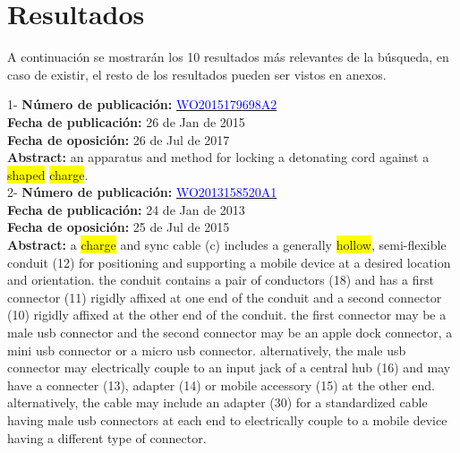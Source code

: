 \chapter{Resultados}
 A continuación se mostrarán los 10 resultados más 
    relevantes de la búsqueda, en caso de existir, el resto de los resultados pueden ser vistos en anexos.
 
 \vspace{1cm}1- \textbf{Número de publicación:} \href{https://worldwide.espacenet.com/publicationDetails/biblio?DB=EPODOC&II=0&ND=3&adjacent=true&locale=en_EP&FT=D&date=20160331&CC=WO&NR=2015179698A2&KC=A2#}{\textcolor{blue}{WO2015179698A2}}\\ 
\textbf{Fecha de publicación:} 26 de Jan de 2015\\ 
\textbf{Fecha de oposición:} 26 de Jul de 2017\\ 
\textbf{Abstract:} an apparatus and method for locking a detonating cord against a \colorbox{yellow}{shaped} \colorbox{yellow}{\colorbox{yellow}{charge}}.\\ 
 

 \vspace{1cm}2- \textbf{Número de publicación:} \href{https://worldwide.espacenet.com/publicationDetails/biblio?DB=EPODOC&II=0&ND=3&adjacent=true&locale=en_EP&FT=D&date=20160331&CC=WO&NR=2013158520A1&KC=A1#}{\textcolor{blue}{WO2013158520A1}}\\ 
\textbf{Fecha de publicación:} 24 de Jan de 2013\\ 
\textbf{Fecha de oposición:} 25 de Jul de 2015\\ 
\textbf{Abstract:} a \colorbox{yellow}{\colorbox{yellow}{charge}} and sync cable (c) includes a generally \colorbox{yellow}{\colorbox{yellow}{hollow}}, semi-flexible conduit (12) for positioning and supporting a mobile device at a desired location and orientation. the conduit contains a pair of conductors (18) and has a first connector (11) rigidly affixed at one end of the conduit and a second connector (10) rigidly affixed at the other end of the conduit. the first connector may be a male usb connector and the second connector may be an apple  dock connector, a mini usb connector or a micro usb connector. alternatively, the male usb connector may electrically couple to an input jack of a central hub (16) and may have a connecter (13), adapter (14) or mobile accessory (15) at the other end. alternatively, the cable may include an adapter (30) for a standardized cable having male usb connectors at each end to electrically couple to a mobile device having a different type of connector.\\ 
 

